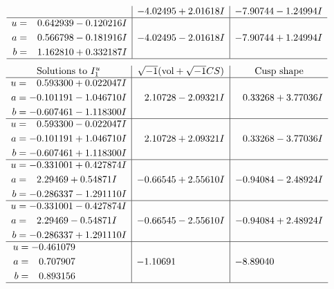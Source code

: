 \documentclass[1p]{elsarticle_modified}
\theoremstyle{definition}
\newcommand{\I}{\sqrt{-1}}
\begin{document}
$$\begin{array}{c|c|c}
 & -4.02495 + 2.01618 I & -7.90744 - 1.24994 I \\ \hline\begin{aligned}
u &= \phantom{-}0.642939 - 0.120216 I \\
a &= \phantom{-}0.566798 - 0.181916 I \\
b &= \phantom{-}1.162810 + 0.332187 I\end{aligned}
 & -4.02495 - 2.01618 I & -7.90744 + 1.24994 I\\
 \hline 
 \end{array}$$\newpage$$\begin{array}{c|c|c}  
\text{Solutions to }I^u_{1}& \I (\text{vol} + \sqrt{-1}CS) & \text{Cusp shape}\\
 \hline 
\begin{aligned}
u &= \phantom{-}0.593300 + 0.022047 I \\
a &= -0.101191 - 1.046710 I \\
b &= -0.607461 - 1.118300 I\end{aligned}
 & \phantom{-}2.10728 - 2.09321 I & \phantom{-}0.33268 + 3.77036 I \\ \hline\begin{aligned}
u &= \phantom{-}0.593300 - 0.022047 I \\
a &= -0.101191 + 1.046710 I \\
b &= -0.607461 + 1.118300 I\end{aligned}
 & \phantom{-}2.10728 + 2.09321 I & \phantom{-}0.33268 - 3.77036 I \\ \hline\begin{aligned}
u &= -0.331001 + 0.427874 I \\
a &= \phantom{-}2.29469 + 0.54871 I \\
b &= -0.286337 - 1.291110 I\end{aligned}
 & -0.66545 + 2.55610 I & -0.94084 - 2.48924 I \\ \hline\begin{aligned}
u &= -0.331001 - 0.427874 I \\
a &= \phantom{-}2.29469 - 0.54871 I \\
b &= -0.286337 + 1.291110 I\end{aligned}
 & -0.66545 - 2.55610 I & -0.94084 + 2.48924 I \\ \hline\begin{aligned}
u &= -0.461079\phantom{ +0.000000I} \\
a &= \phantom{-}0.707907\phantom{ +0.000000I} \\
b &= \phantom{-}0.893156\phantom{ +0.000000I}\end{aligned}
 & -1.10691\phantom{ +0.000000I} & -8.89040\phantom{ +0.000000I}\\
 \hline 
 \end{array}$$\newpage\newpage\renewcommand{\arraystretch}{1}
\end{document}
